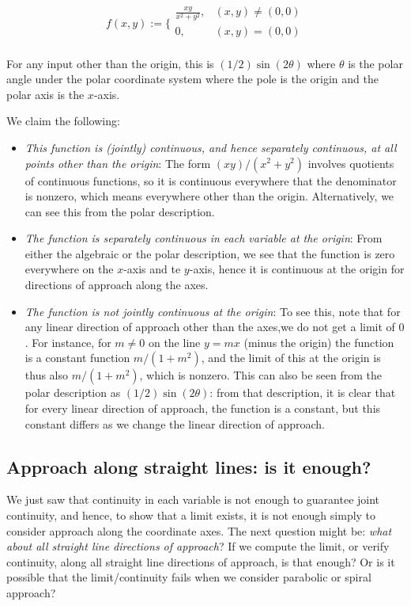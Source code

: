 \documentclass[10pt]{amsart}
\begin{document}
$$f(x,y) := \lbrace \begin{array}{rr} \frac{xy}{x^2 + y^2}, & (x,y) \ne (0,0) \\ 0, & (x,y) = (0,0) \\\end{array}$$

For any input other than the origin, this is $(1/2)\sin(2\theta)$
where $\theta$ is the polar angle under the polar coordinate system
where the pole is the origin and the polar axis is the $x$-axis.

We claim the following:

\begin{itemize}
\item {\em This function is (jointly) continuous, and hence separately
  continuous, at all points other than the origin}: The form
  $(xy)/(x^2 + y^2)$ involves quotients of continuous functions, so it
  is continuous everywhere that the denominator is nonzero, which
  means everywhere other than the origin. Alternatively, we can see
  this from the polar description.
\item {\em The function is separately continuous in each variable at
  the origin}: From either the algebraic or the polar description, we
  see that the function is zero everywhere on the $x$-axis and te
  $y$-axis, hence it is continuous at the origin for directions of
  approach along the axes.
\item {\em The function is not jointly continuous at the origin}: To
  see this, note that for any linear direction of approach other than
  the axes,we do not get a limit of $0$. For instance, for $m \ne 0$
  on the line $y = mx$ (minus the origin) the function is a constant
  function $m/(1 + m^2)$, and the limit of this at the origin is thus
  also $m/(1 + m^2)$, which is nonzero. This can also be seen from the
  polar description as $(1/2) \sin(2\theta)$: from that description,
  it is clear that for every linear direction of approach, the
  function is a constant, but this constant differs as we change the
  linear direction of approach.
\end{itemize}

\subsection{Approach along straight lines: is it enough?}

We just saw that continuity in each variable is not enough to
guarantee joint continuity, and hence, to show that a limit exists, it
is not enough simply to consider approach along the coordinate
axes. The next question might be: {\em what about all straight line
directions of approach}? If we compute the limit, or verify
continuity, along all straight line directions of approach, is that
enough? Or is it possible that the limit/continuity fails when we
consider parabolic or spiral approach?
\end{document}
